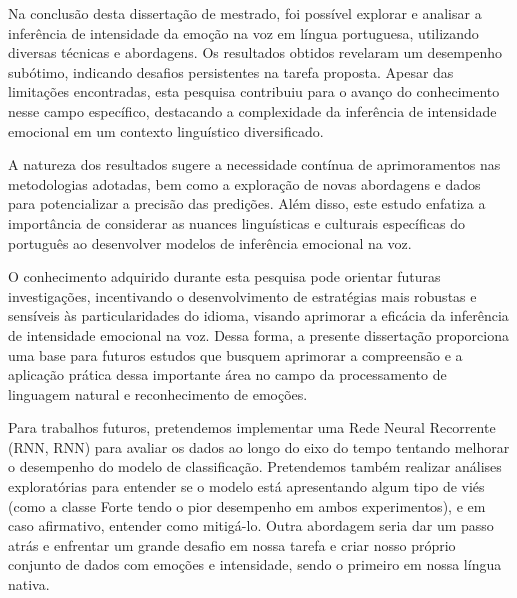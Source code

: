 
Na conclusão desta dissertação de mestrado, foi possível explorar e analisar a inferência de intensidade da emoção na voz em língua portuguesa, utilizando diversas técnicas e abordagens. Os resultados obtidos revelaram um desempenho subótimo, indicando desafios persistentes na tarefa proposta. Apesar das limitações encontradas, esta pesquisa contribuiu para o avanço do conhecimento nesse campo específico, destacando a complexidade da inferência de intensidade emocional em um contexto linguístico diversificado.

A natureza dos resultados sugere a necessidade contínua de aprimoramentos nas metodologias adotadas, bem como a exploração de novas abordagens e dados para potencializar a precisão das predições. Além disso, este estudo enfatiza a importância de considerar as nuances linguísticas e culturais específicas do português ao desenvolver modelos de inferência emocional na voz.

O conhecimento adquirido durante esta pesquisa pode orientar futuras investigações, incentivando o desenvolvimento de estratégias mais robustas e sensíveis às particularidades do idioma, visando aprimorar a eficácia da inferência de intensidade emocional na voz. Dessa forma, a presente dissertação proporciona uma base para futuros estudos que busquem aprimorar a compreensão e a aplicação prática dessa importante área no campo da processamento de linguagem natural e reconhecimento de emoções.

Para trabalhos futuros, pretendemos implementar uma Rede Neural Recorrente (\acrlong{RNN}, \acrshort{RNN}) para avaliar os dados ao longo do eixo do tempo tentando melhorar o desempenho do modelo de classificação. Pretendemos também realizar análises exploratórias para entender se o modelo está apresentando algum tipo de viés (como a classe Forte tendo o pior desempenho em ambos experimentos), e em caso afirmativo, entender como mitigá-lo. Outra abordagem seria dar um passo atrás e enfrentar um grande desafio em nossa tarefa e criar nosso próprio conjunto de dados com emoções e intensidade, sendo o primeiro em nossa língua nativa.
